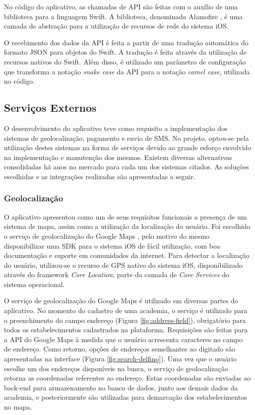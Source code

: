No código do aplicativo, as chamadas de API são feitas com o auxílio de uma biblioteca para a linguagem Swift. A biblioteca, denominada Alamofire \cite{alamofire}, é uma camada de abstração para a utilização de recursos de rede do sistema iOS.

O recebimento dos dados da API é feita a partir de uma tradução automática do formato JSON para objetos do Swift. A tradução é feita através da utilização de recursos nativos do Swift. Além disso, é utilizado um parâmetro de configuração que transforma a notação \textit{snake case} da API para a notação \textit{camel case}, utilizada no código.

\subsection{Serviços Externos}
O desenvolvimento do aplicativo teve como requisito a implementação dos sistemas de geolocalização, pagamento e envio de SMS. No projeto, optou-se pela utilização destes sistemas na forma de serviços devido ao grande esforço envolvido na implementação e manutenção dos mesmos. Existem diversas alternativas consolidadas há anos no mercado para cada um dos sistemas citados. As soluções escolhidas e as integrações realizadas são apresentadas a seguir. 

\subsubsection{Geolocalização}
O aplicativo apresentou como um de seus requisitos funcionais a presença de um sistema de mapa, assim como a utilização da localização do usuário. Foi escolhido o serviço de geolocalização do Google Maps \cite{google-maps}, pelo motivo do mesmo disponibilizar uma SDK para o sistema iOS de fácil utilização, com boa documentação e suporte em comunidades da internet. Para detectar a localização do usuário, utilizou-se o recurso de GPS nativo do sistema iOS, disponibilizado através do framework \textit{Core Location}, parte da camada de \textit{Core Services} do sistema operacional.

O serviço de geolocalização do Google Maps é utilizado em diversas partes do aplicativo. No momento do cadastro de uma academia, o serviço é utilizado para o preenchimento do campo endereço (Figura \ref{fig:address-field}), obrigatório para todos os estabelecimentos cadastrados na plataforma. Requisições são feitas para a API do Google Maps à medida que o usuário acrescenta caracteres no campo de endereço. Como retorno, opções de endereços semelhantes ao digitado são apresentadas na interface (Figura \ref{fig:search-delfino}). Uma vez que o usuário escolhe um dos endereços disponíveis na busca, o serviço de geolocalização retorna as coordenadas referentes ao endereço. Estas coordenadas são enviadas ao back-end para armazenamento no banco de dados, junto aos demais dados da academia, e posteriormente são utilizadas para demarcação dos estabelecimentos no mapa.

